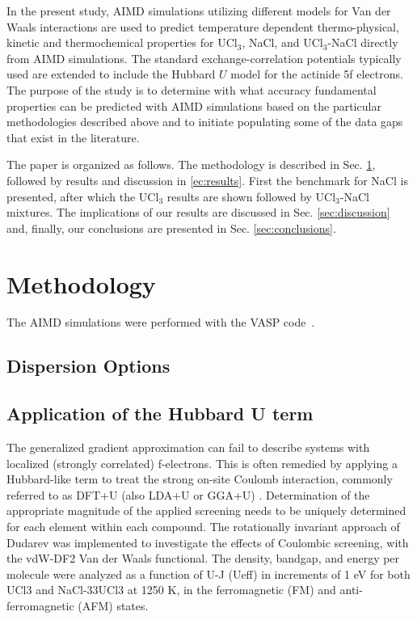 \documentclass[preprint,3p,10pt,twocolumn,number,sort&compress]{elsarticle}
\begin{document}
In the present study, AIMD simulations utilizing different models for Van der Waals interactions are used to predict temperature dependent thermo-physical, kinetic and thermochemical properties for UCl$_3$, NaCl, and UCl$_3$-NaCl directly from AIMD simulations. The standard exchange-correlation potentials typically used are extended to include the Hubbard $U$  model for the actinide 5f electrons. The purpose of the study is to determine with what accuracy fundamental properties can be predicted with AIMD simulations based on the particular methodologies described above and to initiate populating some of the data gaps that exist in the literature. 

The paper is organized as follows. The methodology is described in Sec. \ref{sec:method}, followed by results and discussion in \ref{ec:results}. First the benchmark for NaCl is presented, after which the UCl$_3$ results are shown followed by UCl$_3$-NaCl mixtures. The implications of our results are discussed in Sec. \ref{sec:discussion} and, finally, our conclusions are presented in Sec. \ref{sec:conclusions}. 

\section{Methodology}
\label{sec:method}
The AIMD simulations were performed with the VASP code~\cite{}. 

\subsection{Dispersion Options}



\subsection{Application of the Hubbard U term}

The generalized gradient approximation can fail to describe systems with localized (strongly correlated) f-electrons. This is often remedied by applying a Hubbard-like term to treat the strong on-site Coulomb interaction, commonly referred to as DFT+U (also LDA+U or GGA+U) \cite{rohrbach2003}. Determination of the appropriate magnitude of the applied screening needs to be uniquely determined for each element within each compound. The rotationally invariant approach of Dudarev \cite{dudarev1998} was implemented to investigate the effects of Coulombic screening, with the vdW-DF2 Van der Waals functional. The density, bandgap, and energy per molecule were analyzed as a function of U-J (Ueff) in increments of 1 eV for both UCl3 and NaCl-33UCl3 at 1250 K, in the ferromagnetic (FM) and anti-ferromagnetic (AFM) states. 
\end{document}
